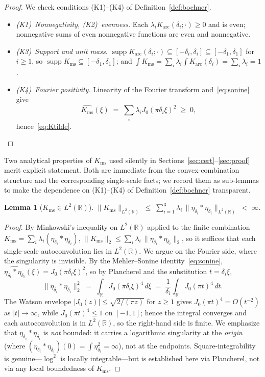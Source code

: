 \documentclass[11pt, letterpaper]{article}
\theoremstyle{paperplain}
\newtheorem{lemma}[theorem]{Lemma}
\theoremstyle{paperdef}
\newcommand{\R}{\mathbb{R}}
\newcommand{\supp}{\operatorname{supp}}
\newcommand{\Karc}{K_{\mathrm{arc}}}
\newcommand{\Kms}{K_{\mathrm{ms}}}
\begin{document}
\begin{proof}
We check conditions (K1)--(K4) of Definition~\ref{def:bochner}.
\begin{itemize}[leftmargin=2em]
\item \emph{(K1)~Nonnegativity, (K2)~evenness.}  Each
  $\lambda_i\Karc(\delta_i;\cdot)\ge 0$ and is even; nonnegative sums
  of even nonnegative functions are even and nonnegative.
\item \emph{(K3)~Support and unit mass.}
  $\supp\Karc(\delta_i;\cdot)\subseteq
  [-\delta_i,\delta_i]\subseteq[-\delta_1,\delta_1]$ for $i\ge 1$, so
  $\supp\Kms\subseteq[-\delta_1,\delta_1]$; and
  $\int\Kms=\sum_i\lambda_i\int\Karc(\delta_i)=\sum_i\lambda_i=1$.
\item \emph{(K4)~Fourier positivity.}  Linearity of the Fourier
  transform and~\eqref{eq:sonine} give
  \[
    \widehat{\Kms}(\xi)
    \;=\;
    \sum_i\lambda_i J_0(\pi\delta_i\xi)^2 \;\ge\; 0,
  \]
  hence~\eqref{eq:Ktilde}.\qedhere
\end{itemize}
\end{proof}

Two analytical properties of $\Kms$ used silently in
Sections~\ref{sec:cert}--\ref{sec:proof} merit explicit
statement.  Both are immediate from the convex-combination
structure and the corresponding single-scale facts; we record them as
sub-lemmas to make the dependence on (K1)--(K4) of
Definition~\ref{def:bochner} transparent.

\begin{lemma}[$\Kms\in L^{2}(\R)$]
\label{lem:Kms-L2}
$\|\Kms\|_{L^{2}(\R)}
\;\le\;\sum_{i=1}^{3}\lambda_i\,\|\eta_{\delta_i}*\eta_{\delta_i}\|_{L^{2}(\R)}
\;<\;\infty$.
\end{lemma}

\begin{proof}
By Minkowski's inequality on $L^{2}(\R)$ applied to the finite
combination $\Kms=\sum_i\lambda_i(\eta_{\delta_i}*\eta_{\delta_i})$,
$\|\Kms\|_{2}\le\sum_i\lambda_i\,\|\eta_{\delta_i}*\eta_{\delta_i}\|_{2}$,
so it suffices that each single-scale autoconvolution lies in
$L^{2}(\R)$.  We argue on the Fourier side, where the singularity is
invisible.  By the Mehler--Sonine identity~\eqref{eq:sonine},
$\widehat{\eta_{\delta_i}*\eta_{\delta_i}}(\xi)=J_0(\pi\delta_i\xi)^{2}$,
so by Plancherel and the substitution $t=\delta_i\xi$,
\[
  \|\eta_{\delta_i}*\eta_{\delta_i}\|_{2}^{2}
  \;=\;\int_{\R}J_0(\pi\delta_i\xi)^{4}\,d\xi
  \;=\;\frac{1}{\delta_i}\int_{\R}J_0(\pi t)^{4}\,dt.
\]
The Watson envelope $|J_0(z)|\le\sqrt{2/(\pi z)}$ for $z\ge 1$ gives
$J_0(\pi t)^{4}=O(t^{-2})$ as $|t|\to\infty$, while $J_0(\pi t)^{4}\le 1$
on $[-1,1]$; hence the integral converges and each autoconvolution is
in $L^{2}(\R)$, so the right-hand side is finite.  We emphasize that
$\eta_{\delta_i}*\eta_{\delta_i}$ is \emph{not} bounded: it carries a
logarithmic singularity at the \emph{origin} (where
$(\eta_{\delta_i}*\eta_{\delta_i})(0)=\int\eta_{\delta_i}^{2}=\infty$),
not at the endpoints.  Square-integrability is genuine---$\log^{2}$ is
locally integrable---but is established here via Plancherel, not via
any local boundedness of $\Kms$.
\end{proof}
\end{document}
